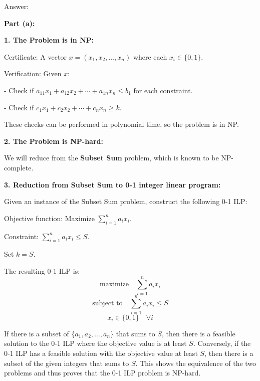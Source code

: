 \documentclass{oxmathproblems}
\begin{document}
\begin{questions}
\newpage
Answer:


\textbf{Part (a):} 

\textbf{1. The Problem is in NP:}

   Certificate: A vector \( x = (x_1, x_2, \ldots, x_n) \) where each \( x_i \in \{0, 1\} \).
   
   Verification: Given \( x \):
   
     - Check if \( a_{11} x_1 + a_{12} x_2 + \cdots + a_{1n} x_n \leq b_1 \) for each constraint.
     
     - Check if \( c_1 x_1 + c_2 x_2 + \cdots + c_n x_n \geq k \).

   These checks can be performed in polynomial time, so the problem is in NP.

\textbf{2. The Problem is NP-hard:}

   We will reduce from the \textbf{Subset Sum} problem, which is known to be NP-complete.

\textbf{3. Reduction from Subset Sum to 0-1 integer linear program:}

   Given an instance of the Subset Sum problem, construct the following 0-1 ILP:
   
     Objective function: Maximize \( \sum_{i=1}^n a_i x_i \).
     
     Constraint: \( \sum_{i=1}^n a_i x_i \leq S \).
     
     Set \( k = S \).
   
   The resulting 0-1 ILP is:
   \[
   \text{maximize} \quad \sum_{i=1}^n a_i x_i
   \]
   \[
   \text{subject to} \quad \sum_{i=1}^n a_i x_i \leq S
   \]
   \[
   x_i \in \{0, 1\} \quad \forall i
   \]

   If there is a subset of \( \{a_1, a_2, \ldots, a_n\} \) that sums to \( S \), then there is a feasible solution to the 0-1 ILP where the objective value is at least \( S \). Conversely, if the 0-1 ILP has a feasible solution with the objective value at least \( S \), then there is a subset of the given integers that sums to \( S \).
   This shows the equivalence of the two problems and thus proves that the 0-1 ILP problem is NP-hard.


\end{questions}
\end{document}
